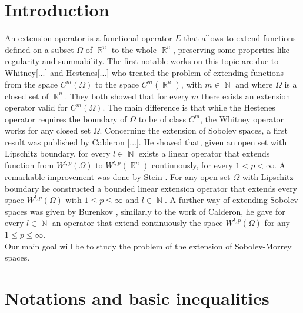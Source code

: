 \documentclass[12pt]{article}
\theoremstyle{definition}
\DeclareMathOperator\rr{\mathbb{R}}
\DeclareMathOperator\nn{\mathbb{N}}
\begin{document}
\section{Introduction}
An extension operator is a functional operator $E$ that allows to extend functions defined on a subset $\Omega$ of $\rr^n$ to the whole $\rr^n$, preserving some properties like regularity and summability. The first notable works on this topic are due to Whitney[...] and Hestenes[...] who treated the problem of extending functions from the space $C^m(\Omega)$ to the space $C^m(\rr^n)$, with $m\in\nn $ and where $\Omega$ is a closed set of $\rr^n$. They both showed that for every $m$ there exists an extension operator valid for $C^m(\Omega)$. The main difference is that while the Hestenes operator requires the boundary of $\Omega$ to be of class $C^m$, the Whitney operator works for any closed set $\Omega.$ Concerning the extension of Sobolev spaces, a first result was published by Calderon [...]. He showed that, given an open set with Lipschitz boundary, for every $l \in \nn$ exists a linear operator that extends function from $W^{l,p}(\Omega)$ to $W^{l,p}(\rr^n)$ continuously, for every $1<p<\infty$. A remarkable improvement was done by Stein \cite{stein}. For any open set $\Omega$ with Lipschitz boundary he constructed a bounded linear extension operator that extends every space $W^{l,p}(\Omega)$ with $1\le p\le \infty$ and $l \in \nn.$ A further way of extending Sobolev spaces was given by Burenkov \cite{burenkov}, similarly to the work of Calderon, he gave for every $l\in \nn$ an operator that extend continuously the space $W^{l,p}(\Omega)$ for any $1\le p\le \infty$. \\
Our main goal will be to study the problem of the extension of Sobolev-Morrey spaces.
\section{Notations and basic inequalities}
\end{document}
